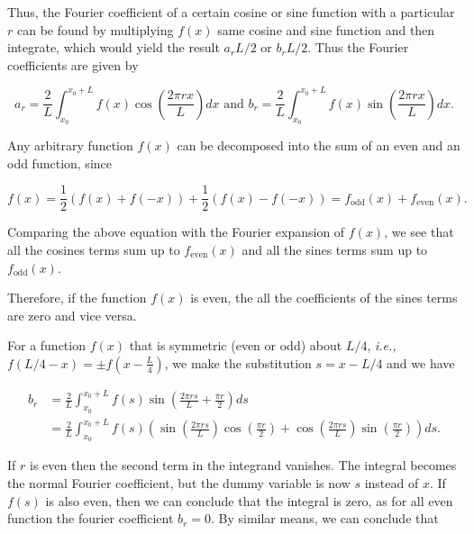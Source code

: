 \documentclass[english,a4paper,12pt]{report}
\begin{document}
Thus, the Fourier coefficient of a certain cosine or sine function with a particular \(r\) can be found by multiplying \(f(x)\) same cosine and sine function and then integrate, which would yield the result \(a_{r}L/2  \text { or } b_{r}L/2  \). Thus the Fourier coefficients are given by 

\begin{equation}
    a_{r} = \frac{2}{L} \int_{x_0}^{x_0 + L} f(x) \cos \left( \frac{2\pi rx}{L}  \right) dx \text { and } b_{r} = \frac{2}{L} \int_{x_0 }^{x_0 + L} f(x) \sin \left( \frac{2\pi rx}{L}  \right) dx.   
\end{equation}

Any arbitrary function \(f(x)\) can be decomposed into the sum of an even and an odd function, since

\begin{equation}
    f(x) = \frac{1}{2}(f(x) + f(-x)) + \frac{1}{2} (f(x) - f(-x)) = f_{\text{odd} }(x) + f_{\text{even} }(x).
\end{equation}

Comparing the above equation with the Fourier expansion of \(f(x)\), we see that all the cosines terms sum up to \(f_{\text{even}}(x)\) and all the sines terms sum up to \(f_{\text{odd} }(x)\). 

Therefore, if the function \(f(x)\) is even, the all the coefficients of the sines terms are zero and vice versa. 

For a function \(f(x)\) that is symmetric (even or odd) about \(L /4 \), \textit{i.e.,} \(f(L /4-x ) = \pm f(x - \frac{L}{4} )\), we make the substitution \(s = x-L /4 \) and we have 

\begin{equation}
    \begin{aligned} 
    b_{r} &= \frac{2}{L} \int_{x_0 }^{x_0 + L} f(s) \sin \left( \frac{2 \pi rs}{L} + \frac{\pi r}{2} \right) ds \\ &= \frac{2}{L} \int_{x_0 }^{x_0 + L} f(s) \left( \sin \left( \frac{2 \pi  rs}{L}  \right) \cos \left( \frac{\pi r}{2}  \right) + \cos \left( \frac{2 \pi rs}{L}  \right) \sin \left( \frac{\pi r}{2} \right)\right) ds.        
    \end{aligned} 
\end{equation}

If \(r\) is even then the second term in the integrand vanishes. The integral becomes the normal Fourier coefficient, but the dummy variable is now \(s\) instead of \(x\). If \(f(s)\) is also even, then we can conclude that the integral is zero, as for all even function the fourier coefficient \(b_{r} = 0\). By similar means, we can conclude that 
\end{document}
